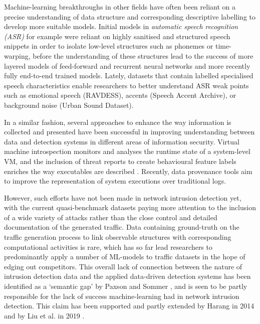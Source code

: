 \documentclass[runningheads]{llncs}
\begin{document}

Machine-learning breakthroughs in other fields have often been reliant on a precise understanding of data structure and corresponding descriptive labelling to develop more suitable models.
Initial models in \textit{automatic speech recognition (ASR)} for example were reliant on highly sanitised and structured speech snippets in order to isolate low-level structures such as phonemes or time-warping, before the understanding of these structures lead to the success of more layered models of feed-forward and recurrent neural networks and more recently fully end-to-end trained models. Lately, datasets that contain labelled specialised speech characteristics enable researchers to better understand ASR weak points such as emotional speech (RAVDESS), accents (Speech Accent Archive), or background noise (Urban Sound Dataset).

In a similar fashion, several approaches to enhance the way information is collected and presented have been successful in improving understanding between data and detection systems in different areas of information security. Virtual machine introspection monitors and analyses the runtime state of a system-level VM, and the inclusion of threat reports to create behavioural feature labels enriches the way executables are described \cite{smith2020mind}. Recently, data provenance tools aim to improve the representation of system executions \cite{barre2019mining} over traditional logs. 

However, such efforts have not been made in network intrusion detection yet, with the current quasi-benchmark datasets paying more attention to the inclusion of a wide variety of attacks rather than the close control and detailed documentation of the generated traffic. Data containing ground-truth on the traffic generation process to link observable structures with corresponding computational activities is rare, which has so far lead researchers to predominantly apply a number of ML-models to traffic datasets in the hope of edging out competitors. %
This overall lack of connection between the nature of intrusion detection data and the applied data-driven detection systems has been identified as a `semantic gap' by Paxson and Sommer \cite{sommer2010outside}, and is seen to be partly responsible for the lack of success machine-learning had in network intrusion detection. This claim has been supported and partly extended by Harang \cite{harang2014bridging} in 2014 and by Liu et al. in 2019 \cite{liu2019machine}.
\end{document}
